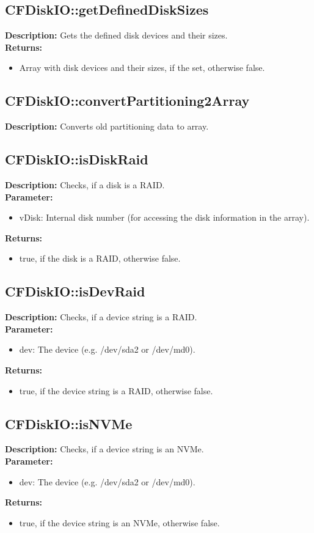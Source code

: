 \subsection{CFDiskIO::getDefinedDiskSizes}
\textbf{Description:} Gets the defined disk devices and their sizes.\\
\textbf{Returns:}
\begin{itemize}
\item Array with disk devices and their sizes, if the set, otherwise false.
\end{itemize}

\subsection{CFDiskIO::convertPartitioning2Array}
\textbf{Description:} Converts old partitioning data to array.\\

\subsection{CFDiskIO::isDiskRaid}
\textbf{Description:} Checks, if a disk is a RAID.\\
\textbf{Parameter:}
\begin{itemize}
\item vDisk: Internal disk number (for accessing the disk information in the array).
\end{itemize}
\textbf{Returns:}
\begin{itemize}
\item true, if the disk is a RAID, otherwise false.
\end{itemize}

\subsection{CFDiskIO::isDevRaid}
\textbf{Description:} Checks, if a device string is a RAID.\\
\textbf{Parameter:}
\begin{itemize}
\item dev: The device (e.g. /dev/sda2 or /dev/md0).
\end{itemize}
\textbf{Returns:}
\begin{itemize}
\item true, if the device string is a RAID, otherwise false.
\end{itemize}

\subsection{CFDiskIO::isNVMe}
\textbf{Description:} Checks, if a device string is an NVMe.\\
\textbf{Parameter:}
\begin{itemize}
\item dev: The device (e.g. /dev/sda2 or /dev/md0).
\end{itemize}
\textbf{Returns:}
\begin{itemize}
\item true, if the device string is an NVMe, otherwise false.
\end{itemize}

